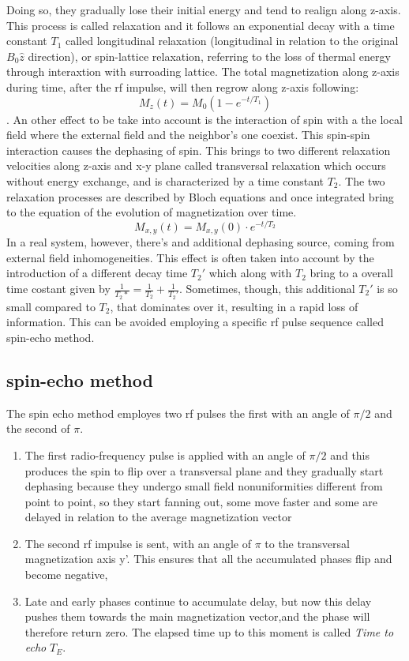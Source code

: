 \documentclass[a4paper,11pt]{article}
\begin{document}
Doing so, they gradually lose their initial energy and tend to realign along z-axis.
This process is called relaxation and it follows an exponential decay with a time constant $T_1$ called longitudinal relaxation (longitudinal in relation to the original $B_0 \hat z$ direction), or spin-lattice relaxation, referring to the loss of thermal energy through interaxtion with surroading lattice. The total magnetization along z-axis during time, after the rf impulse, will then regrow along z-axis following:
\begin{equation}
M_z(t) = M_0 (1-e^{-t/T_1})
\end{equation}.
An other effect to be take into account is the interaction of spin with a the local field where the external field and the neighbor's one coexist. This spin-spin interaction causes the dephasing of spin. This brings to two different relaxation velocities along z-axis and x-y plane called transversal relaxation which occurs without energy exchange, and is characterized by a time constant $T_2$. The two relaxation processes are described by Bloch equations and once integrated bring to the equation of the evolution of magnetization over time.
\begin{equation}
M_{x, y}(t) = M_{x,y}(0)\cdot e^{-t/T_2}
\end{equation}
In a real system, however, there's and additional dephasing source, coming from external field inhomogeneities.
This effect is often taken into account by the introduction of a different decay time $T_2'$ which along with $T_2$ bring to a overall time costant given by $\frac{1}{T_2*} = \frac{1}{T_2}+\frac{1}{T_2'}$.
Sometimes, though, this additional $T_2'$ is so small compared to $T_2$, that dominates over it, resulting in a rapid loss of information.
This can be avoided employing a specific rf pulse sequence called spin-echo method.
\subsection{spin-echo method}
The spin echo method employes two rf pulses the first with an angle of $\pi/2$ and the second of $\pi$.
\begin{enumerate}
\item The first radio-frequency pulse is applied with an angle of $\pi/2$ and this produces the spin to flip over a transversal plane and they gradually start dephasing because they undergo small field nonuniformities different from point to point, so they start fanning out, some move faster and some are delayed in relation to the average magnetization vector
\item The second rf impulse is sent, with an angle of $\pi$ to the transversal magnetization axis y'. This ensures that all the accumulated phases flip and become negative,
\item Late and early phases continue to accumulate delay, but now this delay pushes them towards the main magnetization vector,and the phase will therefore return zero. The elapsed time up to this moment is called \emph{Time to echo} $T_E$.
\end{enumerate}
\end{document}
